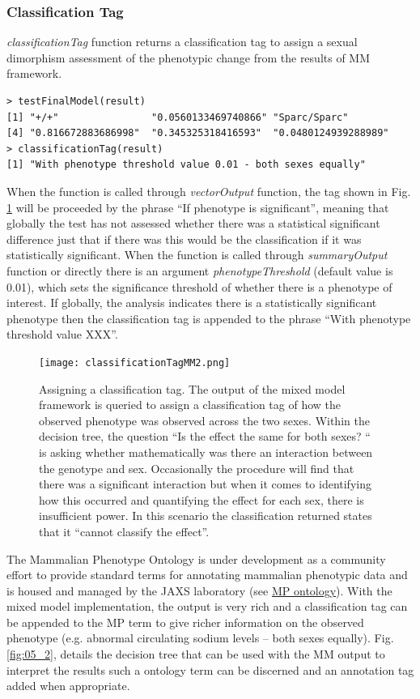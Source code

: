 \documentclass[12pt,a4paper]{article}
\begin{document}
\subsubsection{Classification Tag}
\textit{classificationTag} function returns a classification tag to assign a sexual dimorphism assessment of the phenotypic change from the results of MM framework.


\begingroup
    \fontsize{8pt}{12pt}\selectfont
\begin{verbatim}
> testFinalModel(result)
[1] "+/+"                "0.0560133469740866" "Sparc/Sparc"       
[4] "0.816672883686998"  "0.345325318416593"  "0.0480124939288989"
> classificationTag(result)
[1] "With phenotype threshold value 0.01 - both sexes equally"
\end{verbatim}
\endgroup

When the function is called through \textit{vectorOutput} function,  the tag shown in Fig. \ref{fig:05} will be proceeded by the phrase “If phenotype is significant”,  meaning that globally the test has not assessed whether there was a statistical significant difference just that if there was this would be the classification if it was statistically significant.  When the function is called through \textit{summaryOutput} function or directly there is an argument \textit{phenotypeThreshold} (default value is 0.01),  which sets the significance threshold of whether there is a phenotype of interest.  If globally, the analysis indicates there is a statistically significant phenotype then the classification tag is appended to the phrase “With phenotype threshold value XXX”.

\begin{figure}[!tpb]%
\centerline{\texttt{[image: classificationTagMM2.png]}}
\caption{Assigning a classification tag. The output of the mixed model framework is queried to assign a classification tag of how the observed phenotype was observed across the two sexes. Within the decision tree, the question “Is the effect the same for both sexes? “ is asking whether mathematically was there an interaction between the  genotype and sex. Occasionally the procedure will find that there was a significant interaction but when it comes to identifying how this occurred and quantifying the effect for each sex,  there is insufficient power.  In this scenario the classification returned states  that it “cannot classify the effect”.}\label{fig:05}
\end{figure}

The Mammalian Phenotype Ontology is under development as a community effort to provide standard terms for annotating mammalian phenotypic data and is housed and managed by the JAXS laboratory (see \href{http://www.informatics.jax.org/searches/MP_form.shtml}{MP ontology}). With the mixed model implementation, the output is very rich and a classification tag can be appended to the MP term to give richer information on the observed phenotype (e.g. abnormal circulating sodium levels – both sexes equally).  Fig. \ref{fig:05_2}, details the decision tree that can be used with the MM output to interpret the results such a ontology term can be discerned and an annotation tag added when appropriate.
\end{document}
